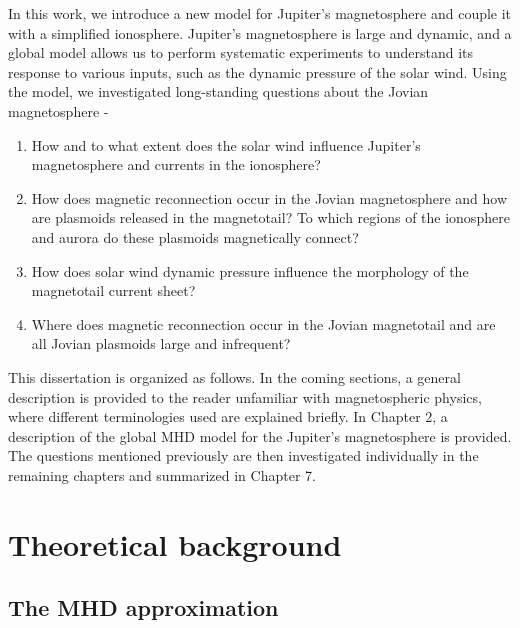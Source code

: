 In this work, we introduce a new model for Jupiter's magnetosphere and couple it with a simplified ionosphere. Jupiter's magnetosphere is large and dynamic, and a global model allows us to perform systematic experiments to understand its response to various inputs, such as the dynamic pressure of the solar wind. Using the model, we investigated long-standing questions about the Jovian magnetosphere - 
\begin{enumerate}
    \item How and to what extent does the solar wind influence Jupiter's magnetosphere and currents in the ionosphere?
    \item How does magnetic reconnection occur in the Jovian magnetosphere and how are plasmoids released in the magnetotail? To which regions of the ionosphere and aurora do these plasmoids magnetically connect?
    \item How does solar wind dynamic pressure influence the morphology of the magnetotail current sheet?
    \item Where does magnetic reconnection occur in the Jovian magnetotail and are all Jovian plasmoids large and infrequent?
\end{enumerate}

This dissertation is organized as follows. In the coming sections, a general description is provided to the reader unfamiliar with magnetospheric physics, where different terminologies used are explained briefly. In Chapter 2, a description of the global MHD model for the Jupiter's magnetosphere is provided. The questions mentioned previously are then investigated individually in the remaining chapters and summarized in Chapter 7.

\section{Theoretical background}

\subsection{The MHD approximation}

